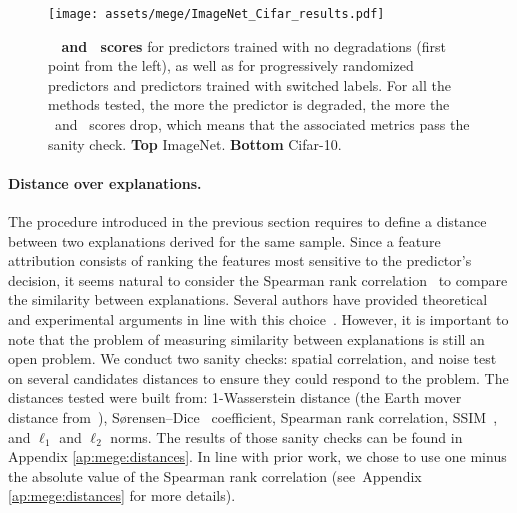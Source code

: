 \begin{figure*}[ht]
    \centering
    \texttt{[image: assets/mege/ImageNet\_Cifar\_results.pdf]}
    \caption{\textbf{\mege~ and \reco~scores} for predictors trained with no degradations (first point from the left), as well as for progressively randomized predictors and predictors trained with switched labels.
    For all the methods tested, the more the predictor is degraded, the more the \consistency ~and \representativity~scores drop, which means that the associated metrics pass the sanity check.
    \textbf{Top} ImageNet. \textbf{Bottom} Cifar-10.
    }
    \label{fig:mege:sanity_check}
\end{figure*}

\paragraph{Distance over explanations.} The procedure introduced in the previous section requires to define a distance between two explanations derived for the same sample. 
Since a feature attribution consists of ranking the features most sensitive to the predictor's decision, it seems natural to consider the  Spearman rank correlation~\cite{spearman1904measure} to compare the similarity between explanations. Several authors have provided theoretical and experimental arguments in line with this choice~\cite{ghorbani2017interpretation, adebayo2018sanity, tomsett2019sanity}. However, it is important to note that the problem of measuring similarity between explanations is still an open problem. We conduct two sanity checks: spatial correlation, and noise test on several candidates distances to ensure they could respond to the problem.  
The distances tested were built from: 1-Wasserstein distance (the Earth mover distance from~\cite{flamary2017pot}), Sørensen–Dice~\cite{dice1945} coefficient, Spearman rank correlation, SSIM~\cite{ssim2004}, and $\ell_1$ and $\ell_2$ norms.
The results of those sanity checks can be found in Appendix \autoref{ap:mege:distances}.
In line with prior work, we chose to use one minus the absolute value of the Spearman rank correlation (see~Appendix \autoref{ap:mege:distances} for more details).

